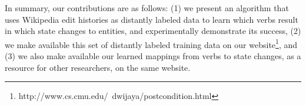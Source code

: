 In summary, our contributions are as follows: (1) we present an algorithm that uses Wikipedia edit histories as distantly labeled data to learn which verbs result in which state changes to entities, and experimentally demonstrate its success, (2) we make available this set of distantly labeled training data on our website\footnote{http://www.cs.cmu.edu/~dwijaya/postcondition.html}, and (3) we also make available our learned mappings from verbs to state changes, as a resource for other researchers, on the same website. 


